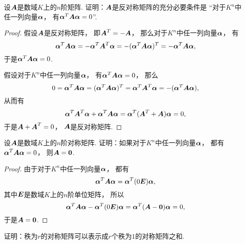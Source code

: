 \begin{example}\label{example:二次型.反对称矩阵对应的二次型恒为零}
设\(\boldsymbol{A}\)是数域\(K\)上的\(n\)阶矩阵.
证明：\(\boldsymbol{A}\)是反对称矩阵的充分必要条件是
“对于\(K^n\)中任一列向量\(\boldsymbol\alpha\)，
有\(\boldsymbol\alpha^T \boldsymbol{A} \boldsymbol\alpha = 0\)”.
\begin{proof}
假设\(\boldsymbol{A}\)是反对称矩阵，
即\(\boldsymbol{A}^T = -\boldsymbol{A}\)，
那么对于\(K^n\)中任一列向量\(\boldsymbol\alpha\)，
有\begin{equation*}
	\vb\alpha^T \vb{A} \vb\alpha
	= - \vb\alpha^T \vb{A}^T \vb\alpha
	= - (\vb\alpha^T \vb{A} \vb\alpha)^T
	= - \vb\alpha^T \vb{A} \vb\alpha, %
\end{equation*}
于是\(\boldsymbol\alpha^T \boldsymbol{A} \boldsymbol\alpha = 0\).

假设对于\(K^n\)中任一列向量\(\boldsymbol\alpha\)，
有\(\boldsymbol\alpha^T \boldsymbol{A} \boldsymbol\alpha = 0\)，
那么\begin{equation*}
	0 = \boldsymbol\alpha^T \boldsymbol{A} \boldsymbol\alpha
	= (\boldsymbol\alpha^T \boldsymbol{A} \boldsymbol\alpha)^T
	= \boldsymbol\alpha^T \boldsymbol{A}^T \boldsymbol\alpha
	= - (\boldsymbol\alpha^T \boldsymbol{A} \boldsymbol\alpha),
\end{equation*}
从而有\begin{equation*}
	\boldsymbol\alpha^T \boldsymbol{A}^T \boldsymbol\alpha
	+ \boldsymbol\alpha^T \boldsymbol{A} \boldsymbol\alpha
	= \boldsymbol\alpha^T (\boldsymbol{A}^T + \boldsymbol{A}) \boldsymbol\alpha
	= 0,
\end{equation*}
于是\(\boldsymbol{A} + \boldsymbol{A}^T = 0\)，
\(\boldsymbol{A}\)是反对称矩阵.
\end{proof}
\end{example}
\begin{example}
设\(\boldsymbol{A}\)是数域\(K\)上的\(n\)阶对称矩阵.
证明：如果对于\(K^n\)中任一列向量\(\boldsymbol\alpha\)，
都有\(\boldsymbol\alpha^T \boldsymbol{A} \boldsymbol\alpha = 0\)，
则\(\boldsymbol{A} = \boldsymbol0\).
\begin{proof}
由于对于\(K^n\)中任一列向量\(\boldsymbol\alpha\)，
都有\begin{equation*}
	\boldsymbol\alpha^T \boldsymbol{A} \boldsymbol\alpha = \boldsymbol\alpha^T (0\boldsymbol{E}) \boldsymbol\alpha,
\end{equation*}
其中\(\boldsymbol{E}\)是数域\(K\)上的\(n\)阶单位矩阵，
所以\begin{equation*}
	\boldsymbol\alpha^T \boldsymbol{A} \boldsymbol\alpha - \boldsymbol\alpha^T (0\boldsymbol{E}) \boldsymbol\alpha
	= \boldsymbol\alpha^T (\boldsymbol{A} - \boldsymbol0) \boldsymbol\alpha
	= 0,
\end{equation*}
于是\(\boldsymbol{A} = \boldsymbol0\).
\end{proof}
\end{example}
\begin{example}
证明：秩为\(r\)的对称矩阵可以表示成\(r\)个秩为\(1\)的对称矩阵之和.
\end{example}
